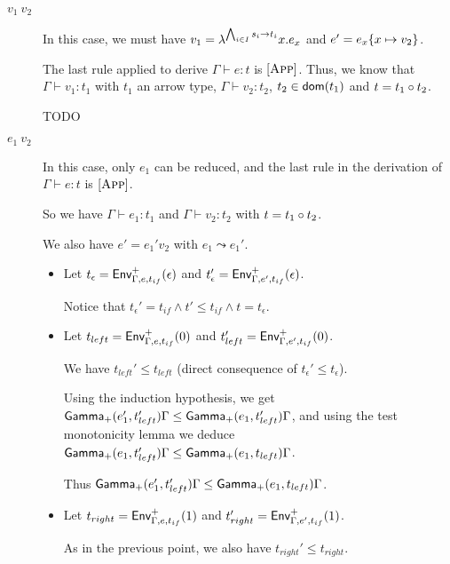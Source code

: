 \documentclass[a4paper]{article}
\theoremstyle{definition}
\begin{document}
        \begin{description}
          \item[$v_1\ v_2$] In this case, we must have $v_1=\lambda^{\bigwedge_{i\in I} s_i\to t_i}x.e_x$ and $e'=e_x\{x \mapsto v_2\}$.
    
          The last rule applied to derive $\Gamma \vdash e:t$ is $[\textsc{App}]$.
          Thus, we know that $\Gamma \vdash v_1 : t_1$ with $t_1$ an arrow type, $\Gamma \vdash v_2 : t_2$, $t_2 \in \textsf{dom}(t_1)$ and $t=t_1\circ t_2$.
          
          TODO
    
          \item[$e_1\ v_2$] In this case, only $e_1$ can be reduced, and the last rule in the derivation of $\Gamma \vdash e:t$ is $[\textsc{App}]$.
          
          So we have $\Gamma \vdash e_1:t_1$ and $\Gamma \vdash v_2:t_2$ with $t=t_1\circ t_2$.
    
          We also have $e' = e_1' v_2$ with $e_1 \leadsto e_1'$.
    
          \begin{itemize}
            \item Let $t_\epsilon = \textsf{Env}^{+}_{\Gamma,e,t_{if}} (\epsilon)$ and $t_\epsilon' = \textsf{Env}^{+}_{\Gamma,e',t_{if}} (\epsilon)$.
            
            Notice that $t_\epsilon' = t_{if} \land t' \leq t_{if} \land t = t_\epsilon$.
    
            \item Let $t_{left} = \textsf{Env}^{+}_{\Gamma,e,t_{if}} (0)$ and $t_{left}' = \textsf{Env}^{+}_{\Gamma,e',t_{if}} (0)$.
    
            We have $t_{left}' \leq t_{left}$ (direct consequence of $t_\epsilon' \leq t_\epsilon$).
      
            Using the induction hypothesis, we get $\textsf{Gamma}_{+}(e_1',t_{left}') \Gamma \leq \textsf{Gamma}_{+}(e_1,t_{left}') \Gamma$,
            and using the test monotonicity lemma we deduce $\textsf{Gamma}_{+}(e_1,t_{left}') \Gamma \leq \textsf{Gamma}_{+}(e_1,t_{left}) \Gamma$.
    
            Thus $\textsf{Gamma}_{+}(e_1',t_{left}') \Gamma \leq \textsf{Gamma}_{+}(e_1,t_{left}) \Gamma$.
    
            \item Let $t_{right} = \textsf{Env}^{+}_{\Gamma,e,t_{if}} (1)$ and $t_{right}' = \textsf{Env}^{+}_{\Gamma,e',t_{if}} (1)$.
            
            As in the previous point, we also have $t_{right}' \leq t_{right}$.
    

\end{itemize}
\end{description}
\end{document}
